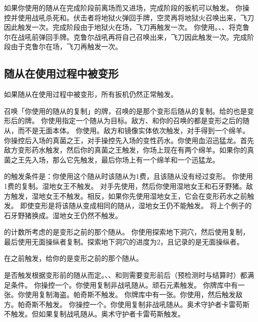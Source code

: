 如果你使用的随从在完成阶段前离场而又进场，完成阶段的扳机可以触发。
\example 你操控并使用战吼杀死和。伏击者将地狱火弹回手牌，空灵再将地狱火召唤出来，飞刀因此触发一次。完成阶段由于地狱火在场，飞刀再触发一次。
\example 你使用。、、将克鲁尔在战吼前弹回手牌。克鲁尔战吼再将自己召唤出来，飞刀因此触发一次。完成阶段由于克鲁尔在场，飞刀再触发一次。

\subsection{随从在使用过程中被变形}

如果随从在使用过程中被变形，所有扳机仍然正常触发。

召唤「你使用的随从的复制」的牌，召唤的是那个变形后随从的复制。给的也是变形后的牌。
\example 你使用指定一个随从为目标。敌方、和你的召唤的都是变形之后的随从，而不是无面本体。
\example 你使用。敌方和镜像实体依次触发，对手得到一个绵羊。
\example 你操控后入场的真菌之王，对手操控先入场的变性药水。你使用血沼迅猛龙。首先敌方变形药水触发，然后你的真菌之王触发，你场上现在有两个绵羊。如果你的真菌之王先入场，那么它先触发，最后你场上有一个绵羊和一个迅猛龙。

的触发条件是：你使用这个随从时该随从为1费，且该随从没有经过变形。
\example 你使用1费的复制。湿地女王不触发。
\example 对手先使用，然后你使用湿地女王和石牙野猪。敌方触发，湿地女王不触发。相反，如果你先使用湿地女王，它会在变形药水之前触发。
\notice 即使变形是将该随从变成相同的随从，湿地女王仍不能触发。
\example 将上个例子的石牙野猪换成。湿地女王仍然不触发。

的计数所考虑的是变形之前的那个随从。
\example 你使用探索地下洞穴，然后使用复制，最后使用无面操纵者复制。探索地下洞穴的进度为2，且记录的是无面操纵者。

在之前触发，给你的是变形之前的那个随从。

是否触发根据变形前的随从而定。、、和则需要变形前后（预检测时与结算时）都满足条件。
\example 你操控一个。你使用复制非战吼随从。顽石元素触发。
\example 你牌库中有一张。你使用复制海盗。帕奇斯不触发。
\example 你牌库中有一张。你使用，然后触发敌方。帕奇斯不触发。
\example 你操控一个。你使用复制非战吼随从。奥术守护者卡雷苟斯不触发。但如果复制战吼随从。奥术守护者卡雷苟斯触发。

